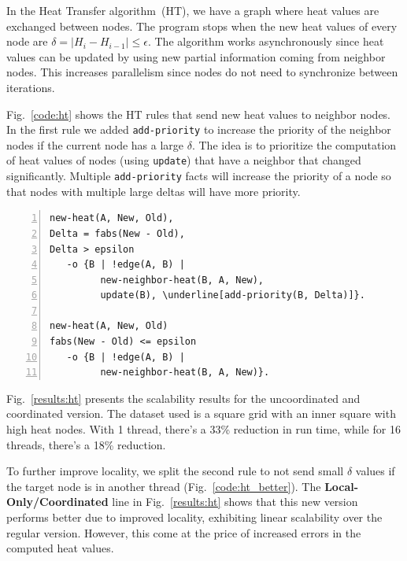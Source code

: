 In the Heat Transfer algorithm~(HT), we have a graph where heat values are
exchanged between nodes. The program stops when the new heat values of every node are
$\delta = |H_i - H_{i-1}| \le \epsilon$. The algorithm works
asynchronously since heat values can be updated by using new partial information
coming from neighbor nodes. This increases parallelism since nodes do not need
to synchronize between iterations.

Fig.~\ref{code:ht} shows the HT rules that send new heat values to
neighbor nodes. In the first rule we added \texttt{add-priority} to increase the priority of the neighbor
nodes if the current node has a large $\delta$. The idea is to prioritize the
computation of heat values of nodes (using \texttt{update}) that have a neighbor
that changed significantly. Multiple \texttt{add-priority} facts will
increase the priority of a node so that nodes with multiple large deltas will
have more priority.

\begin{topfig}
\scriptsize\begin{Verbatim}[numbers=left,commandchars=\\\[\]]
new-heat(A, New, Old),
Delta = fabs(New - Old),
Delta > epsilon
   -o {B | !edge(A, B) |
         new-neighbor-heat(B, A, New),
         update(B), \underline[add-priority(B, Delta)]}.

new-heat(A, New, Old)
fabs(New - Old) <= epsilon
   -o {B | !edge(A, B) |
         new-neighbor-heat(B, A, New)}.
\end{Verbatim}
\end{topfig}
\normalsize

Fig.~\ref{results:ht} presents the scalability results for the uncoordinated
and coordinated version. The dataset used is a square grid with an inner square
with high heat nodes. With 1 thread, there's a 33\% reduction in run time, while
for 16 threads, there's a 18\% reduction.

To further improve locality, we split the second rule to
not send small $\delta$ values if the target node is in another
thread (Fig.~\ref{code:ht_better}). The \textbf{Local-Only/Coordinated} line in
Fig.~\ref{results:ht} shows that this new version performs better due to
improved locality, exhibiting linear scalability over the regular version.
However, this come at the price of increased errors in the computed heat values.

